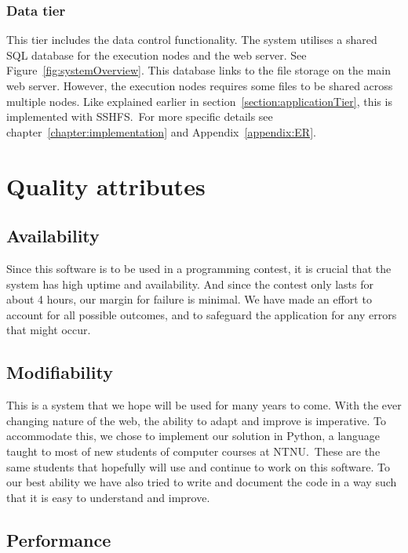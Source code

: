 \subsubsection{Data tier}

This tier includes the data control functionality. The system utilises a
shared SQL database for the execution nodes and the web server. See
Figure~\ref{fig:systemOverview}. This database links to the file storage on the main web
server. However, the execution nodes requires some files to be shared
across multiple nodes. Like explained earlier in
section~\ref{section:applicationTier}, this is implemented with SSHFS.\ For
more specific details see chapter~\ref{chapter:implementation} and Appendix~\ref{appendix:ER}.


\section{Quality attributes}

\subsection{Availability}

Since this software is to be used in a programming contest, it is
crucial that the system has high uptime and availability. And since the
contest only lasts for about 4 hours, our margin for failure is
minimal. We have made an effort to account for all possible outcomes,
and to safeguard the application for any errors that might occur. 

\subsection{Modifiability}

This is a system that we hope will be used for many years to come. With
the ever changing nature of the web, the ability to adapt and improve
is imperative. To accommodate this, we chose to implement our solution
in Python, a language taught to most of new students of computer
courses at NTNU.\ These are the same students that hopefully will use
and continue to work on this software. To our best ability we have also
tried to write and document the code in a way such that it is easy to
understand and improve.

\subsection{Performance}

